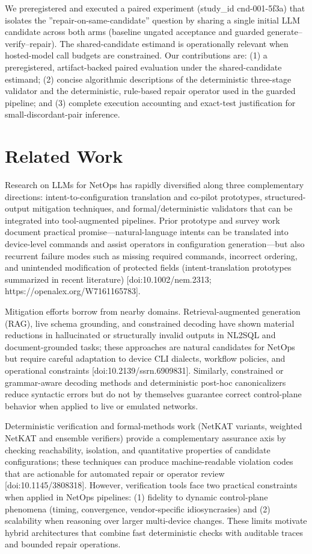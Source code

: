 \documentclass[conference]{IEEEtran}
\begin{document}
We preregistered and executed a paired experiment (study\_id cnd-001-5f3a) that isolates the ''repair-on-same-candidate'' question by sharing a single initial LLM candidate across both arms (baseline ungated acceptance and guarded generate--verify--repair). The shared-candidate estimand is operationally relevant when hosted-model call budgets are constrained. Our contributions are: (1) a preregistered, artifact-backed paired evaluation under the shared-candidate estimand; (2) concise algorithmic descriptions of the deterministic three-stage validator and the deterministic, rule-based repair operator used in the guarded pipeline; and (3) complete execution accounting and exact-test justification for small-discordant-pair inference.

\section{Related Work}
Research on LLMs for NetOps has rapidly diversified along three complementary directions: intent-to-configuration translation and co‑pilot prototypes, structured-output mitigation techniques, and formal/deterministic validators that can be integrated into tool-augmented pipelines. Prior prototype and survey work document practical promise---natural-language intents can be translated into device-level commands and assist operators in configuration generation---but also recurrent failure modes such as missing required commands, incorrect ordering, and unintended modification of protected fields (intent‑translation prototypes summarized in recent literature) [doi:10.1002/nem.2313; https://openalex.org/W7161165783].

Mitigation efforts borrow from nearby domains. Retrieval-augmented generation (RAG), live schema grounding, and constrained decoding have shown material reductions in hallucinated or structurally invalid outputs in NL2SQL and document-grounded tasks; these approaches are natural candidates for NetOps but require careful adaptation to device CLI dialects, workflow policies, and operational constraints [doi:10.2139/ssrn.6909831]. Similarly, constrained or grammar-aware decoding methods and deterministic post-hoc canonicalizers reduce syntactic errors but do not by themselves guarantee correct control‑plane behavior when applied to live or emulated networks.

Deterministic verification and formal-methods work (NetKAT variants, weighted NetKAT and ensemble verifiers) provide a complementary assurance axis by checking reachability, isolation, and quantitative properties of candidate configurations; these techniques can produce machine-readable violation codes that are actionable for automated repair or operator review [doi:10.1145/3808318]. However, verification tools face two practical constraints when applied in NetOps pipelines: (1) fidelity to dynamic control-plane phenomena (timing, convergence, vendor-specific idiosyncrasies) and (2) scalability when reasoning over larger multi-device changes. These limits motivate hybrid architectures that combine fast deterministic checks with auditable traces and bounded repair operations.
\end{document}
